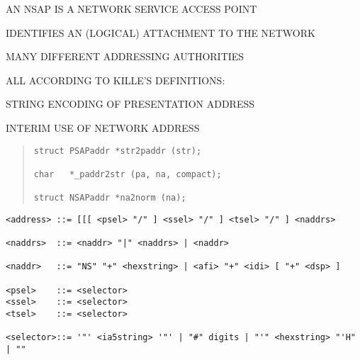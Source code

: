 \begin{bwslide}

\begin{nrtc}
\item	AN NSAP IS A NETWORK SERVICE ACCESS POINT

\item	IDENTIFIES AN (LOGICAL) ATTACHMENT TO THE NETWORK

\item	MANY DIFFERENT ADDRESSING AUTHORITIES
\end{nrtc}
\end{bwslide}


\begin{bwslide}

\begin{nrtc}
\item	ALL ACCORDING TO KILLE'S DEFINITIONS:
    \begin{nrtc}
    \item	STRING ENCODING OF PRESENTATION ADDRESS

    \item	INTERIM USE OF NETWORK ADDRESS
    \end{nrtc}
\end{nrtc}
\begin{quote}\small\begin{verbatim}
struct PSAPaddr *str2paddr (str);

char   *_paddr2str (pa, na, compact);

struct NSAPaddr *na2norm (na);
\end{verbatim}\end{quote}
\end{bwslide}


\begin{bwslide}

\smaller
\begin{verbatim}
<address> ::= [[[ <psel> "/" ] <ssel> "/" ] <tsel> "/" ] <naddrs>

<naddrs>  ::= <naddr> "|" <naddrs> | <naddr>

<naddr>   ::= "NS" "+" <hexstring> | <afi> "+" <idi> [ "+" <dsp> ]

<psel>    ::= <selector>
<ssel>    ::= <selector>
<tsel>    ::= <selector>

<selector>::= '"' <ia5string> '"' | "#" digits | "'" <hexstring> "'H" | ""
\end{verbatim}
\end{bwslide}


